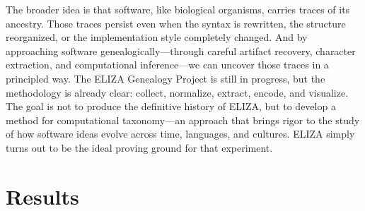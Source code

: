 \documentclass{article}
\begin{document}
The broader idea is that software, like biological organisms, carries traces of its ancestry. Those traces persist even when the syntax is rewritten, the structure reorganized, or the implementation style completely changed. And by approaching software genealogically—through careful artifact recovery, character extraction, and computational inference—we can uncover those traces in a principled way.
The ELIZA Genealogy Project is still in progress, but the methodology is already clear: collect, normalize, extract, encode, and visualize. The goal is not to produce the definitive history of ELIZA, but to develop a method for computational taxonomy—an approach that brings rigor to the study of how software ideas evolve across time, languages, and cultures. ELIZA simply turns out to be the ideal proving ground for that experiment.

\section{Results}
\end{document}
